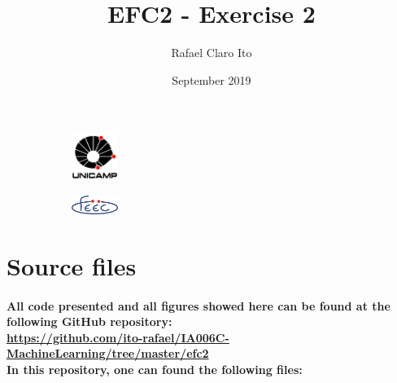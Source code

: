 \documentclass[a4paper]{article}
\begin{document}
\begin{figure}
    \centering
    \begin{subfigure}{0.45\textwidth}
        \centering
        \includegraphics[width=1.5cm]{unicamp}
        \label{fig:unicamp}
    \end{subfigure}
    \hfill
    \begin{subfigure}{0.45\textwidth}
        \centering
        \includegraphics[width=1.5cm]{feec}
        \label{fig:feec}
    \end{subfigure}
\end{figure}

\title{EFC2 - Exercise 2}
\author{Rafael Claro Ito}
\date{September 2019}
\maketitle
\newpage

\section{Source files}

\paragraph{All code presented and all figures showed here can be found at the following GitHub repository:\\
\url{https://github.com/ito-rafael/IA006C-MachineLearning/tree/master/efc2}\\
In this repository, one can found the following files:\\}
\end{document}
